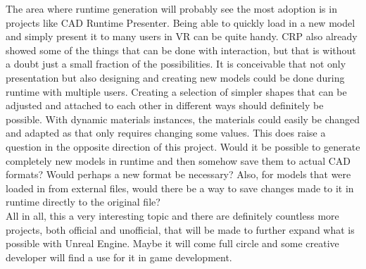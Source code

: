 The area where runtime generation will probably see the most adoption is in projects like CAD Runtime Presenter. Being able to quickly load in a new model and simply present it to many users in VR can be quite handy. \acs{CRP} also already showed some of the things that can be done with interaction, but that is without a doubt just a small fraction of the possibilities. It is conceivable that not only presentation but also designing and creating new models could be done during runtime with multiple users. Creating a selection of simpler shapes that can be adjusted and attached to each other in different ways should definitely be possible. With dynamic materials instances, the materials could easily be changed and adapted as that only requires changing some values. This does raise a question in the opposite direction of this project. Would it be possible to generate completely new models in runtime and then somehow save them to actual CAD formats? Would perhaps a new format be necessary? Also, for models that were loaded in from external files, would there be a way to save changes made to it in runtime directly to the original file?\\
All in all, this a very interesting topic and there are definitely countless more projects, both official and unofficial, that will be made to further expand what is possible with Unreal Engine. Maybe it will come full circle and some creative developer will find a use for it in game development.
